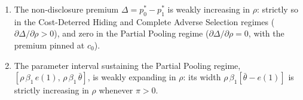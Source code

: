 \label{cor:rho}
\begin{enumerate}[label=(\roman*)]
    \item The non-disclosure premium $\Delta = p_0^* - p_1^*$ is weakly increasing in $\rho$: strictly so in the Cost-Deterred Hiding and Complete Adverse Selection regimes ($\partial\Delta/\partial\rho > 0$), and zero in the Partial Pooling regime ($\partial\Delta/\partial\rho = 0$, with the premium pinned at $c_0$).
    \item The parameter interval sustaining the Partial Pooling regime, $[\rho\,\beta_1\,e(1),\,\rho\,\beta_1\,\bar{\theta}]$, is weakly expanding in $\rho$: its width $\rho\,\beta_1[\bar{\theta}-e(1)]$ is strictly increasing in $\rho$ whenever $\pi>0$.
\end{enumerate}
